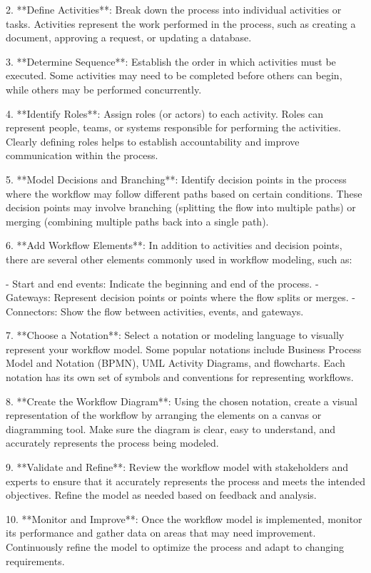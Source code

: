 \documentclass{article}
\begin{document}
2. **Define Activities**: Break down the process into individual activities or tasks. Activities represent the work performed in the process, such as creating a document, approving a request, or updating a database.

3. **Determine Sequence**: Establish the order in which activities must be executed. Some activities may need to be completed before others can begin, while others may be performed concurrently.

4. **Identify Roles**: Assign roles (or actors) to each activity. Roles can represent people, teams, or systems responsible for performing the activities. Clearly defining roles helps to establish accountability and improve communication within the process.

5. **Model Decisions and Branching**: Identify decision points in the process where the workflow may follow different paths based on certain conditions. These decision points may involve branching (splitting the flow into multiple paths) or merging (combining multiple paths back into a single path).

6. **Add Workflow Elements**: In addition to activities and decision points, there are several other elements commonly used in workflow modeling, such as:

   - Start and end events: Indicate the beginning and end of the process.
   - Gateways: Represent decision points or points where the flow splits or merges.
   - Connectors: Show the flow between activities, events, and gateways.

7. **Choose a Notation**: Select a notation or modeling language to visually represent your workflow model. Some popular notations include Business Process Model and Notation (BPMN), UML Activity Diagrams, and flowcharts. Each notation has its own set of symbols and conventions for representing workflows.

8. **Create the Workflow Diagram**: Using the chosen notation, create a visual representation of the workflow by arranging the elements on a canvas or diagramming tool. Make sure the diagram is clear, easy to understand, and accurately represents the process being modeled.

9. **Validate and Refine**: Review the workflow model with stakeholders and experts to ensure that it accurately represents the process and meets the intended objectives. Refine the model as needed based on feedback and analysis.

10. **Monitor and Improve**: Once the workflow model is implemented, monitor its performance and gather data on areas that may need improvement. Continuously refine the model to optimize the process and adapt to changing requirements.
\end{document}
